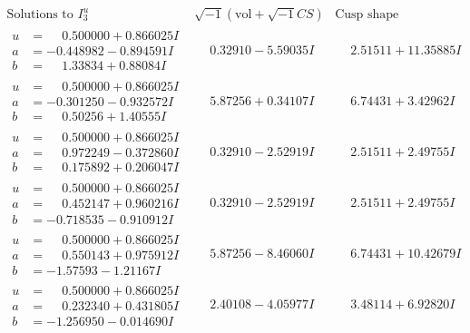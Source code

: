 \documentclass[1p]{elsarticle_modified}
\theoremstyle{definition}
\newcommand{\I}{\sqrt{-1}}
\begin{document}
$$\begin{array}{c|c|c}  
\text{Solutions to }I^u_{3}& \I (\text{vol} + \sqrt{-1}CS) & \text{Cusp shape}\\
 \hline 
\begin{aligned}
u &= \phantom{-}0.500000 + 0.866025 I \\
a &= -0.448982 - 0.894591 I \\
b &= \phantom{-}1.33834 + 0.88084 I\end{aligned}
 & \phantom{-}0.32910 - 5.59035 I & \phantom{-}2.51511 + 11.35885 I \\ \hline\begin{aligned}
u &= \phantom{-}0.500000 + 0.866025 I \\
a &= -0.301250 - 0.932572 I \\
b &= \phantom{-}0.50256 + 1.40555 I\end{aligned}
 & \phantom{-}5.87256 + 0.34107 I & \phantom{-}6.74431 + 3.42962 I \\ \hline\begin{aligned}
u &= \phantom{-}0.500000 + 0.866025 I \\
a &= \phantom{-}0.972249 - 0.372860 I \\
b &= \phantom{-}0.175892 + 0.206047 I\end{aligned}
 & \phantom{-}0.32910 - 2.52919 I & \phantom{-}2.51511 + 2.49755 I \\ \hline\begin{aligned}
u &= \phantom{-}0.500000 + 0.866025 I \\
a &= \phantom{-}0.452147 + 0.960216 I \\
b &= -0.718535 - 0.910912 I\end{aligned}
 & \phantom{-}0.32910 - 2.52919 I & \phantom{-}2.51511 + 2.49755 I \\ \hline\begin{aligned}
u &= \phantom{-}0.500000 + 0.866025 I \\
a &= \phantom{-}0.550143 + 0.975912 I \\
b &= -1.57593 - 1.21167 I\end{aligned}
 & \phantom{-}5.87256 - 8.46060 I & \phantom{-}6.74431 + 10.42679 I \\ \hline\begin{aligned}
u &= \phantom{-}0.500000 + 0.866025 I \\
a &= \phantom{-}0.232340 + 0.431805 I \\
b &= -1.256950 - 0.014690 I\end{aligned}
 & \phantom{-}2.40108 - 4.05977 I & \phantom{-}3.48114 + 6.92820 I \\ \hline\begin{aligned}

\end{aligned}
\end{array}$$
\end{document}
